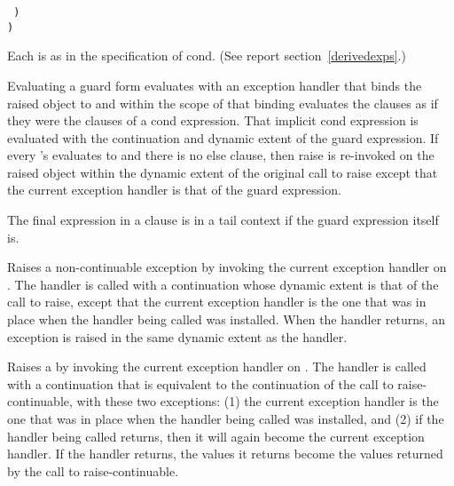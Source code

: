 \begin{entry}{%
{\tt\obeyspaces%
\hspace*{3em}  \dotsfoo)\\
\hspace*{2em})}\\
}

\syntax
Each  is as in the specification of {\cf cond}.
(See report section~\ref{derivedexps}.)

\semantics
Evaluating a {\cf guard} form evaluates  with an exception
handler that binds the raised object to  and within the scope of
that binding evaluates the clauses as if they were the clauses of a
{\cf cond} expression. That implicit {\cf cond} expression is evaluated with the
continuation and dynamic extent of the {\cf guard} expression. If every
's  evaluates to \schfalse{} and there
is no {\cf else} clause, then
{\cf raise} is re-invoked on the raised object within the dynamic
extent of the original call to {\cf raise} except that the current
exception handler is that of the {\cf guard} expression.

The final expression in a  clause is in a tail context if
the {\cf guard} expression itself is.
\end{entry}

\begin{entry}{%
}

Raises a non-continuable exception by invoking the current exception
handler on . The handler is called with a continuation whose
dynamic extent is that of the call to {\cf raise}, except that
the current exception handler is the one that was in place when the
handler being called was installed.  When the handler returns, an
exception is raised in the same dynamic extent as the handler.
\end{entry}

\begin{entry}{%
}

Raises a  by invoking the current
exception handler on . The handler is called with a
continuation that is equivalent to the continuation of the call to
{\cf raise-continuable}, with these two exceptions: (1) the current
exception handler is the one that was in place when the handler being
called was installed, and (2) if the handler being called returns,
then it will again become the current exception handler.  If the
handler returns, the values it returns become the values returned by
the call to {\cf raise-continuable}.
\end{entry}

